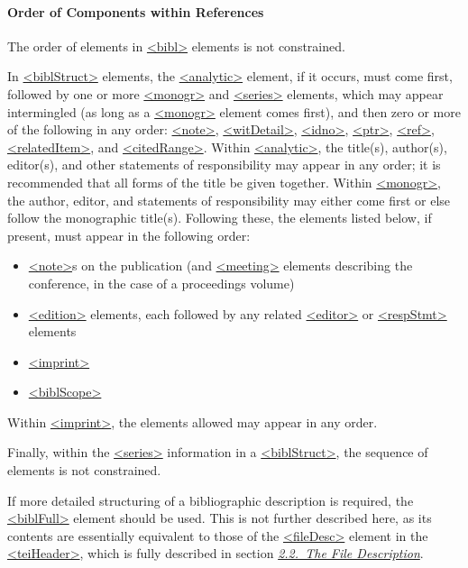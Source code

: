 \paragraph[{Order of Components within References}]{Order of Components within References}\label{COBICOO}\par
The order of elements in \hyperref[TEI.bibl]{<bibl>} elements is not constrained.\par
In \hyperref[TEI.biblStruct]{<biblStruct>} elements, the \hyperref[TEI.analytic]{<analytic>} element, if it occurs, must come first, followed by one or more \hyperref[TEI.monogr]{<monogr>} and \hyperref[TEI.series]{<series>} elements, which may appear intermingled (as long as a \hyperref[TEI.monogr]{<monogr>} element comes first), and then zero or more of the following in any order: \hyperref[TEI.note]{<note>}, \hyperref[TEI.witDetail]{<witDetail>}, \hyperref[TEI.idno]{<idno>}, \hyperref[TEI.ptr]{<ptr>}, \hyperref[TEI.ref]{<ref>}, \hyperref[TEI.relatedItem]{<relatedItem>}, and \hyperref[TEI.citedRange]{<citedRange>}. Within \hyperref[TEI.analytic]{<analytic>}, the title(s), author(s), editor(s), and other statements of responsibility may appear in any order; it is recommended that all forms of the title be given together. Within \hyperref[TEI.monogr]{<monogr>}, the author, editor, and statements of responsibility may either come first or else follow the monographic title(s). Following these, the elements listed below, if present, must appear in the following order: \begin{itemize}
\item \hyperref[TEI.note]{<note>}s on the publication (and \hyperref[TEI.meeting]{<meeting>} elements describing the conference, in the case of a proceedings volume)
\item \hyperref[TEI.edition]{<edition>} elements, each followed by any related \hyperref[TEI.editor]{<editor>} or \hyperref[TEI.respStmt]{<respStmt>} elements
\item \hyperref[TEI.imprint]{<imprint>}
\item \hyperref[TEI.biblScope]{<biblScope>}
\end{itemize}  Within \hyperref[TEI.imprint]{<imprint>}, the elements allowed may appear in any order.\par
Finally, within the \hyperref[TEI.series]{<series>} information in a \hyperref[TEI.biblStruct]{<biblStruct>}, the sequence of elements is not constrained.\par
If more detailed structuring of a bibliographic description is required, the \hyperref[TEI.biblFull]{<biblFull>} element should be used. This is not further described here, as its contents are essentially equivalent to those of the \hyperref[TEI.fileDesc]{<fileDesc>} element in the \hyperref[TEI.teiHeader]{<teiHeader>}, which is fully described in section \textit{\hyperref[HD2]{2.2.\ The File Description}}.
